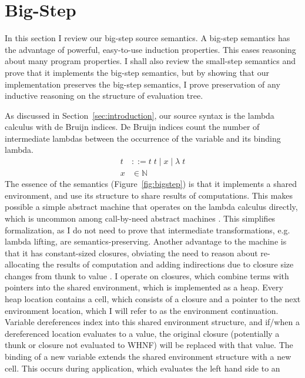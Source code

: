 \section{Big-Step \ce} \label{sec:cem_big}

In this section I review our big-step source semantics. A big-step semantics
has the advantage of powerful, easy-to-use induction properties. This eases
reasoning about many program properties. I shall also review the small-step
semantics and prove that it implements the big-step semantics, but by showing
that our implementation preserves the big-step semantics, I prove preservation
of any inductive reasoning on the structure of evaluation tree.  

As discussed in Section~\ref{sec:introduction}, our source syntax is the lambda
calculus with de Bruijn indices. De Bruijn indices count the number of
intermediate lambdas between the occurrence of the variable and its binding
lambda.  
\begin{align*}
 t &::= t \; t \; | \; x \; | \;  \lambda \; t \\
 x &\in \mathbb{N}
\end{align*}
The essence of the \ce semantics (Figure~\ref{fig:bigstep}) is that it
implements a shared environment, and use its structure to share results of
computations. This makes possible a simple abstract machine that operates on the
lambda calculus directly, which is uncommon among call-by-need abstract machines
\cite{jonesstg,launchburynatural,TIM,johnsson1984efficient}. This simplifies
formalization, as I do not need to prove that intermediate transformations,
e.g. lambda lifting, are semantics-preserving. Another advantage to the \ce
machine is that it has constant-sized closures, obviating the need to reason
about re-allocating the results of computation and adding indirections due to
closure size changes from thunk to value \cite{jonesstg}. I operate on
closures, which combine terms with pointers into the shared environment, which
is implemented as a heap. Every heap location contains a cell, which consists of
a closure and a pointer to the next environment location, which I will refer to
as the environment continuation.  Variable dereferences index into this shared
environment structure, and if/when a dereferenced location evaluates to a value,
the original closure (potentially a thunk or closure not evaluated to WHNF) will
be replaced with that value. The binding of a new variable extends the shared
environment structure with a new
cell. This occurs during application, which evaluates the left hand side to an
